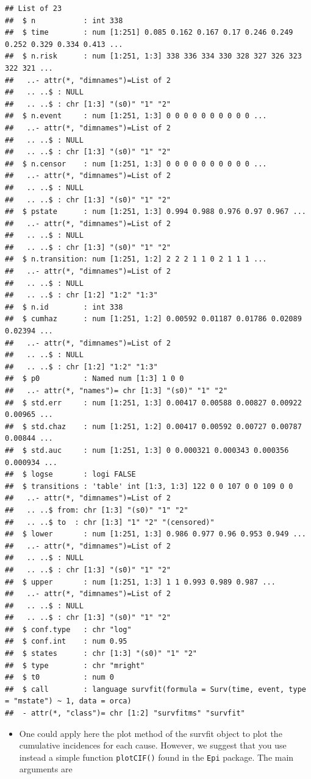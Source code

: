 \documentclass[
]{book}
\providecommand{\tightlist}{%
  \setlength{\itemsep}{0pt}\setlength{\parskip}{0pt}}
\begin{document}
\begin{verbatim}
## List of 23
##  $ n           : int 338
##  $ time        : num [1:251] 0.085 0.162 0.167 0.17 0.246 0.249 0.252 0.329 0.334 0.413 ...
##  $ n.risk      : num [1:251, 1:3] 338 336 334 330 328 327 326 323 322 321 ...
##   ..- attr(*, "dimnames")=List of 2
##   .. ..$ : NULL
##   .. ..$ : chr [1:3] "(s0)" "1" "2"
##  $ n.event     : num [1:251, 1:3] 0 0 0 0 0 0 0 0 0 0 ...
##   ..- attr(*, "dimnames")=List of 2
##   .. ..$ : NULL
##   .. ..$ : chr [1:3] "(s0)" "1" "2"
##  $ n.censor    : num [1:251, 1:3] 0 0 0 0 0 0 0 0 0 0 ...
##   ..- attr(*, "dimnames")=List of 2
##   .. ..$ : NULL
##   .. ..$ : chr [1:3] "(s0)" "1" "2"
##  $ pstate      : num [1:251, 1:3] 0.994 0.988 0.976 0.97 0.967 ...
##   ..- attr(*, "dimnames")=List of 2
##   .. ..$ : NULL
##   .. ..$ : chr [1:3] "(s0)" "1" "2"
##  $ n.transition: num [1:251, 1:2] 2 2 2 1 1 0 2 1 1 1 ...
##   ..- attr(*, "dimnames")=List of 2
##   .. ..$ : NULL
##   .. ..$ : chr [1:2] "1:2" "1:3"
##  $ n.id        : int 338
##  $ cumhaz      : num [1:251, 1:2] 0.00592 0.01187 0.01786 0.02089 0.02394 ...
##   ..- attr(*, "dimnames")=List of 2
##   .. ..$ : NULL
##   .. ..$ : chr [1:2] "1:2" "1:3"
##  $ p0          : Named num [1:3] 1 0 0
##   ..- attr(*, "names")= chr [1:3] "(s0)" "1" "2"
##  $ std.err     : num [1:251, 1:3] 0.00417 0.00588 0.00827 0.00922 0.00965 ...
##  $ std.chaz    : num [1:251, 1:2] 0.00417 0.00592 0.00727 0.00787 0.00844 ...
##  $ std.auc     : num [1:251, 1:3] 0 0.000321 0.000343 0.000356 0.000934 ...
##  $ logse       : logi FALSE
##  $ transitions : 'table' int [1:3, 1:3] 122 0 0 107 0 0 109 0 0
##   ..- attr(*, "dimnames")=List of 2
##   .. ..$ from: chr [1:3] "(s0)" "1" "2"
##   .. ..$ to  : chr [1:3] "1" "2" "(censored)"
##  $ lower       : num [1:251, 1:3] 0.986 0.977 0.96 0.953 0.949 ...
##   ..- attr(*, "dimnames")=List of 2
##   .. ..$ : NULL
##   .. ..$ : chr [1:3] "(s0)" "1" "2"
##  $ upper       : num [1:251, 1:3] 1 1 0.993 0.989 0.987 ...
##   ..- attr(*, "dimnames")=List of 2
##   .. ..$ : NULL
##   .. ..$ : chr [1:3] "(s0)" "1" "2"
##  $ conf.type   : chr "log"
##  $ conf.int    : num 0.95
##  $ states      : chr [1:3] "(s0)" "1" "2"
##  $ type        : chr "mright"
##  $ t0          : num 0
##  $ call        : language survfit(formula = Surv(time, event, type = "mstate") ~ 1, data = orca)
##  - attr(*, "class")= chr [1:2] "survfitms" "survfit"
\end{verbatim}

\begin{itemize}
\tightlist
\item
  One could apply here the plot method of the survfit object to plot the
  cumulative incidences for each cause. However, we suggest that you use
  instead a simple function \texttt{plotCIF()} found in the \texttt{Epi} package.
  The main arguments are
\end{itemize}
\end{document}
